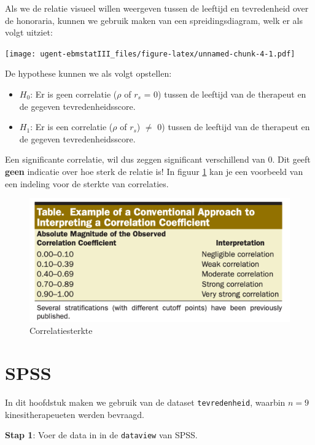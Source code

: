 \documentclass[
]{book}
\providecommand{\tightlist}{%
  \setlength{\itemsep}{0pt}\setlength{\parskip}{0pt}}
\theoremstyle{definition}
\theoremstyle{definition}
\theoremstyle{definition}
\theoremstyle{definition}
\theoremstyle{remark}
\begin{document}
Als we de relatie visueel willen weergeven tussen de leeftijd en tevredenheid over de honoraria, kunnen we gebruik maken van een spreidingsdiagram, welk er als volgt uitziet:

\texttt{[image: ugent-ebmstatIII\_files/figure-latex/unnamed-chunk-4-1.pdf]}

De hypothese kunnen we als volgt opstellen:

\begin{itemize}
\tightlist
\item
  \(H_0\): Er is geen correlatie (\(\rho\) of \(r_s\) = 0) tussen de leeftijd van de therapeut en de gegeven tevredenheidsscore.
\item
  \(H_1\): Er is een correlatie (\(\rho\) of \(r_s\)) \(\neq\) 0) tussen de leeftijd van de therapeut en de gegeven tevredenheidsscore.
\end{itemize}

Een significante correlatie, wil dus zeggen significant verschillend van 0. Dit geeft \textbf{geen} indicatie over hoe sterk de relatie is! In figuur \ref{fig:corrmagn} kan je een voorbeeld van een indeling voor de sterkte van correlaties.

\begin{figure}
\includegraphics[width=1\linewidth]{img/corr_magn} \caption{Correlatiesterkte}\label{fig:corrmagn}
\end{figure}

\hypertarget{spss}{%
\section*{SPSS}\label{spss}}


In dit hoofdstuk maken we gebruik van de dataset \texttt{tevredenheid}, waarbin \(n=9\) kinesitherapeueten werden bevraagd.

\textbf{Stap 1}: Voer de data in in de \texttt{dataview} van {SPSS}.
\end{document}
